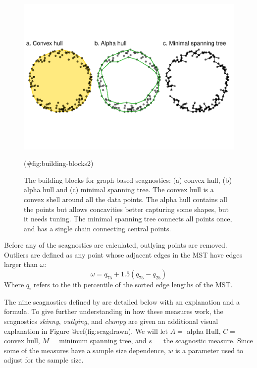 \begin{Schunk}
\begin{figure}
\includegraphics[width=1\linewidth]{mason-lee-laa-cook_files/figure-latex/building-blocks2-1} \caption[The building blocks for graph-based scagnostics]{The building blocks for graph-based scagnostics: (a) convex hull, (b) alpha hull and (c) minimal spanning tree. The convex hull is a convex shell around all the data points. The alpha hull contains all the points but allows concavities better capturing some shapes, but it needs tuning. The minimal spanning tree connects all points once, and has a single chain connecting central points.}(\#fig:building-blocks2)
\end{figure}
\end{Schunk}

Before any of the scagnostics are calculated, outlying points are
removed. Outliers are defined as any point whose adjacent edges in the
MST have edges larger than \(\omega\):
\[ \omega = q_{75} + 1.5(q_{75} - q_{25})\] Where \(q_i\) refers to the
ith percentile of the sorted edge lengths of the MST.

The nine scagnostics defined by \citet{scagdist} are detailed below with
an explanation and a formula. To give further understanding in how these
measures work, the scagnostics \emph{skinny}, \emph{outlying}, and
\emph{clumpy} are given an additional visual explanation in Figure
@ref(fig:scagdrawn). We will let \(A=\) alpha Hull, \(C=\) convex hull,
\(M\) = minimum spanning tree, and \(s=\) the scagnostic measure. Since
some of the measures have a sample size dependence, \(w\) is a parameter
used to adjust for the sample size.

